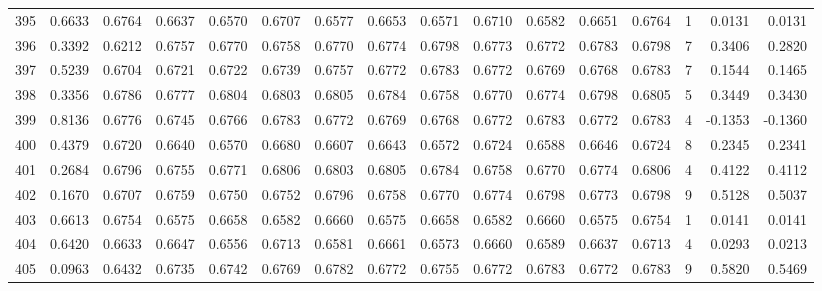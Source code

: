 \begin{tabular}{lrrrrrrrrrrrrrrr}
395 &      0.6633 &  0.6764 &  0.6637 &  0.6570 &  0.6707 &  0.6577 &  0.6653 &  0.6571 &  0.6710 &  0.6582 &   0.6651 &     0.6764 &      1 &                    0.0131 &                     0.0131 \\
396 &      0.3392 &  0.6212 &  0.6757 &  0.6770 &  0.6758 &  0.6770 &  0.6774 &  0.6798 &  0.6773 &  0.6772 &   0.6783 &     0.6798 &      7 &                    0.3406 &                     0.2820 \\
397 &      0.5239 &  0.6704 &  0.6721 &  0.6722 &  0.6739 &  0.6757 &  0.6772 &  0.6783 &  0.6772 &  0.6769 &   0.6768 &     0.6783 &      7 &                    0.1544 &                     0.1465 \\
398 &      0.3356 &  0.6786 &  0.6777 &  0.6804 &  0.6803 &  0.6805 &  0.6784 &  0.6758 &  0.6770 &  0.6774 &   0.6798 &     0.6805 &      5 &                    0.3449 &                     0.3430 \\
399 &      0.8136 &  0.6776 &  0.6745 &  0.6766 &  0.6783 &  0.6772 &  0.6769 &  0.6768 &  0.6772 &  0.6783 &   0.6772 &     0.6783 &      4 &                   -0.1353 &                    -0.1360 \\
400 &      0.4379 &  0.6720 &  0.6640 &  0.6570 &  0.6680 &  0.6607 &  0.6643 &  0.6572 &  0.6724 &  0.6588 &   0.6646 &     0.6724 &      8 &                    0.2345 &                     0.2341 \\
401 &      0.2684 &  0.6796 &  0.6755 &  0.6771 &  0.6806 &  0.6803 &  0.6805 &  0.6784 &  0.6758 &  0.6770 &   0.6774 &     0.6806 &      4 &                    0.4122 &                     0.4112 \\
402 &      0.1670 &  0.6707 &  0.6759 &  0.6750 &  0.6752 &  0.6796 &  0.6758 &  0.6770 &  0.6774 &  0.6798 &   0.6773 &     0.6798 &      9 &                    0.5128 &                     0.5037 \\
403 &      0.6613 &  0.6754 &  0.6575 &  0.6658 &  0.6582 &  0.6660 &  0.6575 &  0.6658 &  0.6582 &  0.6660 &   0.6575 &     0.6754 &      1 &                    0.0141 &                     0.0141 \\
404 &      0.6420 &  0.6633 &  0.6647 &  0.6556 &  0.6713 &  0.6581 &  0.6661 &  0.6573 &  0.6660 &  0.6589 &   0.6637 &     0.6713 &      4 &                    0.0293 &                     0.0213 \\
405 &      0.0963 &  0.6432 &  0.6735 &  0.6742 &  0.6769 &  0.6782 &  0.6772 &  0.6755 &  0.6772 &  0.6783 &   0.6772 &     0.6783 &      9 &                    0.5820 &                     0.5469 \\

\end{tabular}
